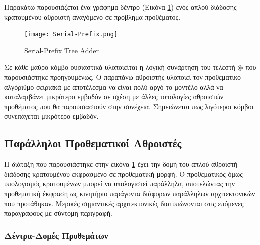 Παρακάτω παρουσιάζεται ένα γράφημα-δέντρο (Εικόνα \ref{Serial-PrefixTree}) 
ενός απλού διάδοσης κρατουμένου αθροιστή αναγόμενο σε πρόβλημα προθέματος.\\ 
\begin{figure}[H]
\centering
\texttt{[image: Serial-Prefix.png]}
\caption{Serial-Prefix Tree Adder}
\label{Serial-PrefixTree}
\end{figure}
Σε κάθε μαύρο κόμβο ουσιαστικά υλοποιείται η λογική συνάρτηση του τελεστή $\circledast$
που παρουσιάστηκε προηγουμένως. Ο παραπάνω αθροιστής υλοποιεί τον προθεματικό αλγόριθμο
σειριακά με αποτέλεσμα να είναι πολύ αργό το μοντέλο αλλά να καταλαμβάνει μικρότερο εμβαδόν
σε σχέση με άλλες τοπολογίες αθροιστών προθέματος που θα παρουσιαστούν στην συνέχεια. Σημειώνεται πως λιγότεροι κόμβοι συνεπάγεται μικρότερο εμβαδόν.












\subsection{Παράλληλοι Προθεματικοί Αθροιστές}
Η διάταξη που παρουσιάστηκε στην εικόνα \ref{Serial-PrefixTree} έχει την δομή 
του απλού αθροιστή διάδοσης κρατουμένου εκφρασμένο σε προθεματική μορφή. Ο προθεματικός
όμως υπολογισμός κρατουμένων μπορεί να υπολογιστεί παράλληλα, αποτελώντας την προθεματική 
έκφραση ως κινητήριο παράγοντα διάφορων παράλληλων αρχιτεκτονικών που προτάθηκαν.
Μερικές σημαντικές αρχιτεκτονικές διατυπώνονται στις επόμενες παραγράφους με σύντομη
περιγραφή.




\subsubsection{Δέντρα-Δομές Προθεμάτων}


